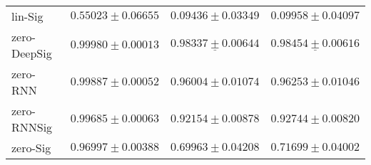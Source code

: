\begin{tabular}{llll}
lin-Sig        &                           $ 0.55023 \pm 0.06655 $ &                           $ 0.09436 \pm 0.03349 $ &                           $ 0.09958 \pm 0.04097 $ \\
zero-DeepSig   &               $  \mathbf{ 0.99980 \pm 0.00013 } $ &            $  \underline{ 0.98337 \pm 0.00644 } $ &            $  \underline{ 0.98454 \pm 0.00616 } $ \\
zero-RNN       &                           $ 0.99887 \pm 0.00052 $ &                           $ 0.96004 \pm 0.01074 $ &                           $ 0.96253 \pm 0.01046 $ \\
zero-RNNSig    &                           $ 0.99685 \pm 0.00063 $ &                           $ 0.92154 \pm 0.00878 $ &                           $ 0.92744 \pm 0.00820 $ \\
zero-Sig       &                           $ 0.96997 \pm 0.00388 $ &                           $ 0.69963 \pm 0.04208 $ &                           $ 0.71699 \pm 0.04002 $ \\
\bottomrule
\end{tabular}
